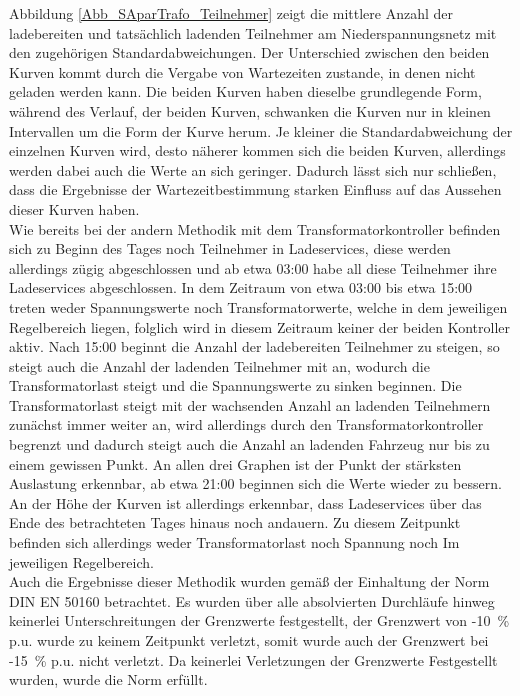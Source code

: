 Abbildung \ref{Abb_SAparTrafo_Teilnehmer} zeigt die mittlere Anzahl der ladebereiten und tatsächlich ladenden Teilnehmer am Niederspannungsnetz mit den zugehörigen Standardabweichungen. Der Unterschied zwischen den beiden Kurven kommt durch die Vergabe von Wartezeiten zustande, in denen nicht geladen werden kann. Die beiden Kurven haben dieselbe grundlegende Form, während des Verlauf, der beiden Kurven, schwanken die Kurven nur in kleinen Intervallen um die Form der Kurve herum. Je kleiner die Standardabweichung der einzelnen Kurven wird, desto näherer kommen sich die beiden Kurven, allerdings werden dabei auch die Werte an sich geringer. Dadurch lässt sich nur schließen, dass die Ergebnisse der Wartezeitbestimmung starken Einfluss auf das Aussehen dieser Kurven haben.\\
Wie bereits bei der andern Methodik mit dem Transformatorkontroller befinden sich zu Beginn des Tages noch Teilnehmer in Ladeservices, diese werden allerdings zügig abgeschlossen und ab etwa 03:00 habe all diese Teilnehmer ihre Ladeservices abgeschlossen. In dem Zeitraum von etwa 03:00 bis etwa 15:00 treten weder Spannungswerte noch Transformatorwerte, welche in dem jeweiligen Regelbereich liegen, folglich wird in diesem Zeitraum keiner der beiden Kontroller aktiv. Nach 15:00 beginnt die Anzahl der ladebereiten Teilnehmer zu steigen, so steigt auch die Anzahl der ladenden Teilnehmer mit an, wodurch die Transformatorlast steigt und die Spannungswerte zu sinken beginnen. Die Transformatorlast steigt mit der wachsenden Anzahl an ladenden Teilnehmern zunächst immer weiter an, wird allerdings durch den Transformatorkontroller begrenzt und dadurch steigt auch die Anzahl an ladenden Fahrzeug nur bis zu einem gewissen Punkt. An allen drei Graphen ist der Punkt der stärksten Auslastung erkennbar, ab etwa 21:00 beginnen sich die Werte wieder zu bessern. An der Höhe der Kurven ist allerdings erkennbar, dass Ladeservices über das Ende des betrachteten Tages hinaus noch andauern. Zu diesem Zeitpunkt befinden sich allerdings weder Transformatorlast noch Spannung noch Im jeweiligen Regelbereich.\\
Auch die Ergebnisse dieser Methodik wurden gemäß der Einhaltung der Norm DIN EN 50160 betrachtet. Es wurden über alle absolvierten Durchläufe hinweg keinerlei Unterschreitungen der Grenzwerte festgestellt, der Grenzwert von -10~\% p.u. wurde zu keinem Zeitpunkt verletzt, somit wurde auch der Grenzwert bei -15~\% p.u. nicht verletzt. Da keinerlei Verletzungen der Grenzwerte Festgestellt wurden, wurde die Norm erfüllt.\\
